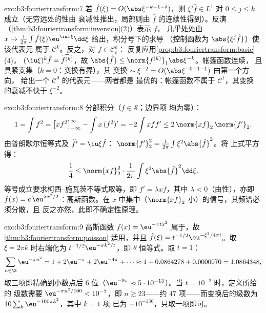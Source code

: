\begin{solution}{exo:b3:fouriertransform:7}
若 $\hat f(\xi) = O(\abs\xi^{-k-1-\delta})$，则 $\xi^j\hat f
\in L^1$ 对 $0 \leq j \leq k$ 成立（无穷远处的性由
衰减性推出，局部则由 $\hat f$ 的连续性得到）。反演
（\cref{thm:b3:fouriertransform:inversion}(2)）表示 $f$，
几乎处处由 $x \mapsto \frac1{2\pi}\int\hat f(\xi)\eu^{\iu
x\xi}\dd\xi$ 给出，积分号下的求导
（控制函数为 $\abs{\xi^j\hat f}$）使该代表元
属于 $\mathcal C^k$。反之，对 $f \in \mathcal C_c^k$：
反复应用\cref{prop:b3:fouriertransform:basic}(4)，
$(\iu\xi)^k\hat f = \widehat{f^{(k)}}$，故 $\abs{\hat f} \leq
\norm{f^{(k)}}_1\abs\xi^{-k}$。帐篷函数连续，
且具紧支集（$k = 0$：变换有界），其
变换 $\sim \xi^{-2} = O(\abs\xi^{-0-1-1})$ 由第一个方向，
给出一个 $\mathcal C^0$ 的代表元——两者都是
最优的：帐篷函数不属于 $\mathcal C^1$，其变换
的衰减不快于 $\xi^{-2}$。
\end{solution}

\begin{solution}{exo:b3:fouriertransform:8}
分部积分（$f \in \mathcal S$；边界项
均为零）：
\[
1 = \int f^2 = \bigl[xf^2\bigr]_{-\infty}^{\infty} - \int
x\,(f^2)' = -2\int xff' \leq 2\,\norm{xf}_2\,\norm{f'}_2 .
\]
由普朗歇尔恒等式及 $\widehat{f'} = \iu\xi\hat f$：
$\norm{f'}_2^2 = \frac1{2\pi}\int\xi^2\abs{\hat f}^2$。将
上式平方得：
\[
\frac14 \leq \norm{xf}_2^2\cdot\frac1{2\pi}
\int\xi^2\abs{\hat f}^2\dd\xi .
\]
等号成立要求柯西–施瓦茨不等式取等，即 $f' =
\lambda xf$，其中 $\lambda < 0$（由性），亦即 $f(x) =
c\,\eu^{\lambda x^2/2}$：高斯函数。在
$x$ 中集中（$\norm{xf}_2$ 小）的信号，其频谱必须分散，且
反之亦然，此即不确定性原理。
\end{solution}

\begin{solution}{exo:b3:fouriertransform:9}
高斯函数 $f(x) = \eu^{-\pi tx^2}$ 属于，故
\cref{thm:b3:fouriertransform:poisson} 适用，并且
$\hat f(\xi) = t^{-1/2}\eu^{-\xi^2/4\pi t}$。取 $\xi = 2\pi
k$ 时右端化为 $t^{-1/2}\eu^{-\pi k^2/t}$，即
$\theta$ 恒等式。取 $t = 1$：
\[
\sum_{n\in\Z}\eu^{-\pi n^2} = 1 + 2\eu^{-\pi} + 2\eu^{-4\pi} +
\cdots \approx 1 + 0.0864278 + 0.0000070 = 1.0864348,
\]
取三项即精确到小数点后 $6$ 位（$\eu^{-9\pi}
\approx 5\cdot10^{-13}$）。当 $t = 10^{-2}$ 时，定义所给的
级数需要 $\eu^{-\pi n^2/100} < 10^{-7}$，即 $n \gtrsim
23$——约 $47$ 项——而变换后的级数为
$10\sum_k\eu^{-100\pi k^2}$，其中 $k = 1$ 项
已为 $\sim 10^{-136}$，只取一项即可。
\end{solution}

